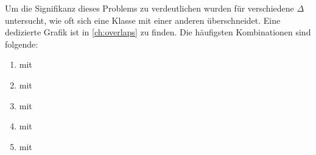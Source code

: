 Um die Signifikanz dieses Problems zu verdeutlichen wurden für verschiedene $\Delta$ untersucht, wie oft sich eine Klasse mit einer anderen überschneidet.
Eine dedizierte Grafik ist in \autoref{ch:overlaps} zu finden.
Die häufigsten Kombinationen sind folgende:

\begin{enumerate}
    \item {} mit 
    \item {} mit 
    \item {} mit 
    \item {} mit 
    \item {} mit 
\end{enumerate}

